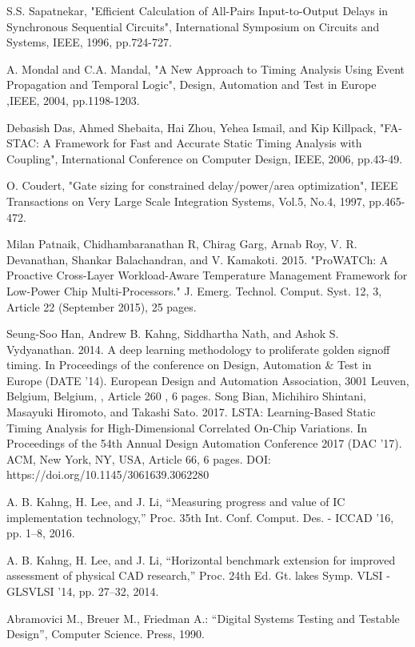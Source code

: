 \begin{thebibliography}{1}
S.S. Sapatnekar, "Efficient Calculation of All-Pairs Input-to-Output Delays in Synchronous Sequential Circuits", International Symposium on Circuits and Systems, IEEE, 1996, pp.724-727.

A. Mondal and C.A. Mandal, "A New Approach to Timing Analysis Using Event Propagation and Temporal Logic",  Design, Automation and Test in Europe ,IEEE, 2004, pp.1198-1203.

Debasish Das, Ahmed Shebaita, Hai Zhou, Yehea Ismail, and Kip Killpack, "FA-STAC: A Framework for Fast and Accurate Static Timing Analysis with Coupling", International Conference on Computer Design, IEEE, 2006, pp.43-49.

O. Coudert, "Gate sizing for constrained delay/power/area optimization", IEEE Transactions on Very Large Scale Integration Systems, Vol.5, No.4, 1997, pp.465-472.


 Milan Patnaik, Chidhambaranathan R, Chirag Garg, Arnab Roy, V. R. Devanathan, Shankar Balachandran, and V. Kamakoti. 2015. "ProWATCh: A Proactive Cross-Layer Workload-Aware Temperature Management Framework for Low-Power Chip Multi-Processors." J. Emerg. Technol. Comput. Syst. 12, 3, Article 22 (September 2015), 25 pages.


 Seung-Soo Han, Andrew B. Kahng, Siddhartha Nath, and Ashok S. Vydyanathan. 2014. A deep learning methodology to proliferate golden signoff timing. In Proceedings of the conference on Design, Automation \& Test in Europe (DATE '14). European Design and Automation Association, 3001 Leuven, Belgium, Belgium, , Article 260 , 6 pages. 
 Song Bian, Michihiro Shintani, Masayuki Hiromoto, and Takashi Sato. 2017. LSTA: Learning-Based Static Timing Analysis for High-Dimensional Correlated On-Chip Variations. In Proceedings of the 54th Annual Design Automation Conference 2017 (DAC '17). ACM, New York, NY, USA, Article 66, 6 pages. DOI: https://doi.org/10.1145/3061639.3062280 

A. B. Kahng, H. Lee, and J. Li, “Measuring progress and value of IC implementation technology,” Proc. 35th Int. Conf. Comput. Des.  - ICCAD ’16, pp. 1–8, 2016.

 A. B. Kahng, H. Lee, and J. Li, “Horizontal benchmark extension for improved assessment of physical CAD research,” Proc. 24th Ed. Gt. lakes Symp. VLSI - GLSVLSI ’14, pp. 27–32, 2014.

 Abramovici M., Breuer M., Friedman A.: “Digital Systems Testing and Testable Design”, Computer Science. Press, 1990.



\end{thebibliography}
